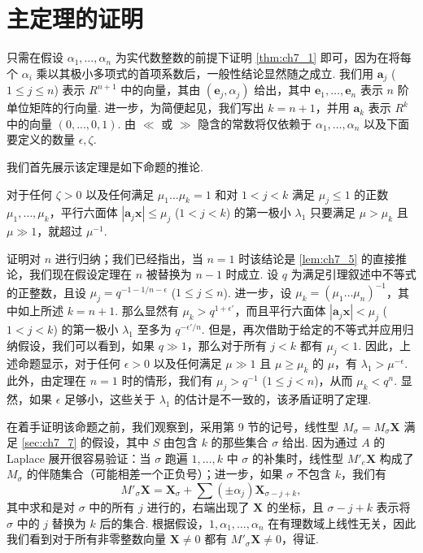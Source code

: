 \section{主定理的证明}\label{sec:ch7_10}

只需在假设 $\alpha_1, \dots, \alpha_n$ 为实代数整数的前提下证明 \autoref{thm:ch7_1} 即可，因为在将每个 $\alpha_i$ 乘以其极小多项式的首项系数后，一般性结论显然随之成立. 我们用 $\mathbf{a}_j$ ($1 \leqslant j \leqslant n$) 表示 $R^{n+1}$ 中的向量，其由 $(\mathbf{e}_j, \alpha_j)$ 给出，其中 $\mathbf{e}_1, \dots, \mathbf{e}_n$ 表示 $n$ 阶单位矩阵的行向量. 进一步，为简便起见，我们写出 $k = n + 1$，并用 $\mathbf{a}_k$ 表示 $R^k$ 中的向量 $(0, ..., 0, 1)$. 由 $\ll$ 或 $\gg$ 隐含的常数将仅依赖于 $\alpha_1, \dots, \alpha_n$ 以及下面要定义的数量 $\epsilon, \zeta$.

我们首先展示该定理是如下命题的推论.

对于任何 $\zeta > 0$ 以及任何满足 $\mu_1 \dots \mu_k = 1$ 和对 $1 < j < k$ 满足 $\mu_j \le 1$ 的正数 $\mu_1, \dots, \mu_k$，平行六面体 $|\mathbf{a}_j \mathbf{x}| \le \mu_j$ ($1 < j < k$) 的第一极小 $\lambda_1$ 只要满足 $\mu > \mu_k$ 且 $\mu \gg 1$，就超过 $\mu^{-1}$.

证明对 $n$ 进行归纳；我们已经指出，当 $n=1$ 时该结论是 \autoref{lem:ch7_5} 的直接推论，我们现在假设定理在 $n$ 被替换为 $n-1$ 时成立. 设 $q$ 为满足引理叙述中不等式的正整数，且设 $\mu_j = q^{-1-1/n-\epsilon}$ ($1 \le j \le n$). 进一步，设 $\mu_k = (\mu_1 \dots \mu_n)^{-1}$，其中如上所述 $k = n + 1$. 那么显然有 $\mu_k > q^{1+\epsilon'}$，而且平行六面体 $|\mathbf{a}_j \mathbf{x}| < \mu_j$ ($1 < j < k$) 的第一极小 $\lambda_1$ 至多为 $q^{-\epsilon'/n}$. 但是，再次借助于给定的不等式并应用归纳假设，我们可以看到，如果 $q \gg 1$，那么对于所有 $j < k$ 都有 $\mu_j < 1$. 因此，上述命题显示，对于任何 $\epsilon > 0$ 以及任何满足 $\mu \gg 1$ 且 $\mu \ge \mu_k$ 的 $\mu$，有 $\lambda_1 > \mu^{-\epsilon}$. 此外，由定理在 $n = 1$ 时的情形，我们有 $\mu_j > q^{-1}$ ($1 \leqslant j < n$)，从而 $\mu_k < q^n$. 显然，如果 $\epsilon$ 足够小，这些关于 $\lambda_1$ 的估计是不一致的，该矛盾证明了定理.

在着手证明该命题之前，我们观察到，采用第 9 节的记号，线性型 $M_\sigma = M_\sigma \mathbf{X}$ 满足 \autoref{sec:ch7_7} 的假设，其中 $S$ 由包含 $k$ 的那些集合 $\sigma$ 给出. 因为通过 $A$ 的 Laplace 展开很容易验证：当 $\sigma$ 跑遍 $1, \dots, k$ 中 $\sigma$ 的补集时，线性型 $M'_e \mathbf{X}$ 构成了 $M_\sigma$ 的伴随集合（可能相差一个正负号）；进一步，如果 $\sigma$ 不包含 $k$，我们有
\[M'_\sigma \mathbf{X} = \mathbf{X}_\sigma + \sum ( \pm \alpha_j ) \mathbf{X}_{\sigma-j+k},\]
其中求和是对 $\sigma$ 中的所有 $j$ 进行的，右端出现了 $\mathbf{X}$ 的坐标，且 $\sigma-j+k$ 表示将 $\sigma$ 中的 $j$ 替换为 $k$ 后的集合. 根据假设，$1, \alpha_1, \dots, \alpha_n$ 在有理数域上线性无关，因此我们看到对于所有非零整数向量 $\mathbf{X} \neq 0$ 都有 $M'_\sigma \mathbf{X} \neq 0$，得证.

